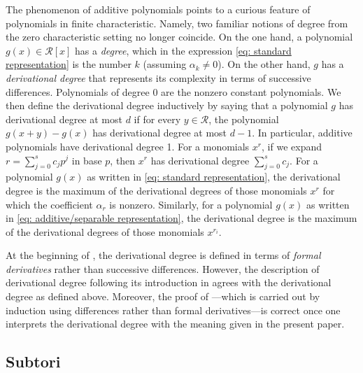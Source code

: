 \documentclass[11pt]{amsart}
\theoremstyle{theorem}
\theoremstyle{definition}
\newcommand{\mR}{\mathcal{R}}
\begin{document}
The phenomenon of additive polynomials points to a curious feature of polynomials in finite characteristic.
Namely, two familiar notions of degree from the zero characteristic setting no longer coincide.
On the one hand, a polynomial $g(x) \in \mR[x]$ has a \emph{degree}, which in the expression \eqref{eq: standard representation} is the number $k$ (assuming $\alpha_k \ne 0$).
On the other hand, $g$ has a \emph{derivational degree} that represents its complexity in terms of successive differences.
Polynomials of degree 0 are the nonzero constant polynomials.
We then define the derivational degree inductively by saying that a polynomial $g$ has derivational degree at most $d$ if for every $y \in \mR$, the polynomial $g(x+y) - g(x)$ has derivational degree at most $d-1$.
In particular, additive polynomials have derivational degree 1.
For a monomials $x^r$, if we expand $r = \sum_{j=0}^s c_j p^j$ in base $p$, then $x^r$ has derivational degree $\sum_{j=0}^s c_j$.
For a polynomial $g(x)$ as written in \eqref{eq: standard representation}, the derivational degree is the maximum of the derivational degrees of those monomials $x^r$ for which the coefficient $\alpha_r$ is nonzero.
Similarly, for a polynomial $g(x)$ as written in \eqref{eq: additive/separable representation}, the derivational degree is the maximum of the derivational degrees of those monomials $x^{r_i}$.

At the beginning of \cite[Section 8]{bl}, the derivational degree is defined in terms of \emph{formal derivatives} rather than successive differences.
However, the description of derivational degree following its introduction in \cite[Section 8]{bl} agrees with the derivational degree as defined above.
Moreover, the proof of \cite[Theorem 8.1]{bl}---which is carried out by induction using differences rather than formal derivatives---is correct once one interprets the derivational degree with the meaning given in the present paper.


\subsection{Subtori}
\end{document}
